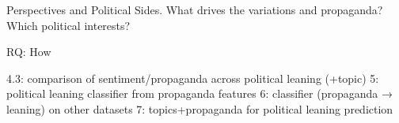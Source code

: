 Perspectives and Political Sides. What drives  the variations and propaganda? Which political interests? 

RQ:
How


4.3: comparison of sentiment/propaganda across political leaning (+topic)
5: political leaning classifier from propaganda features
6: classifier (propaganda → leaning) on other datasets
7: topics+propaganda for political leaning prediction
